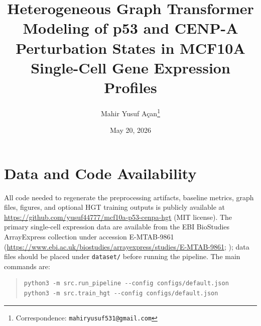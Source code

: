 \documentclass[11pt]{article}
\title{Heterogeneous Graph Transformer Modeling of p53 and CENP-A Perturbation States in MCF10A Single-Cell Gene Expression Profiles}
\author[1]{Mahir Yusuf Açan\thanks{Correspondence: \texttt{mahiryusuf531@gmail.com}}}
\affil[1]{Üsküdar University, Department of Dentistry, Istanbul, Turkey}
\date{May 20, 2026}
\begin{document}
\maketitle








\section*{Data and Code Availability}
All code needed to regenerate the preprocessing artifacts, baseline metrics, graph files, figures, and optional HGT training outputs is publicly available at
\url{https://github.com/yusuf44777/mcf10a-p53-cenpa-hgt} (MIT license).
The primary single-cell expression data are available from the EBI BioStudies ArrayExpress collection under accession E-MTAB-9861 (\url{https://www.ebi.ac.uk/biostudies/arrayexpress/studies/E-MTAB-9861}; \citep{jeffery2022cenpa}); data files should be placed under \texttt{dataset/} before running the pipeline.
The main commands are:

\begin{quote}
\small
\begin{verbatim}
python3 -m src.run_pipeline --config configs/default.json
python3 -m src.train_hgt --config configs/default.json
\end{verbatim}
\end{quote}



\end{document}
